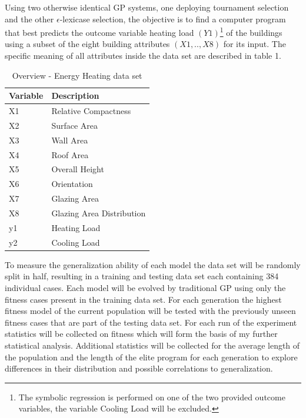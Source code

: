 \documentclass[
  12pt,
]{article}
\begin{document}
Using two otherwise identical GP systems, one deploying tournament
selection and the other \(\epsilon\)-lexicase selection, the objective
is to find a computer program that best predicts the outcome variable
heating load \((Y1)\)\footnote{The symbolic regression is performed on
  one of the two provided outcome variables, the variable Cooling Load
  will be excluded.} of the buildings using a subset of the eight
building attributes \((X1,..,X8)\) for its input. The specific meaning
of all attributes inside the data set are described in table 1.

\begin{table}[!h]

\caption{\label{tab:unnamed-chunk-1}Overview - Energy Heating data set}
\centering
\begin{tabular}[t]{l|l}
\hline
\textbf{Variable} & \textbf{Description}\\
\hline
X1 & Relative Compactness\\
\hline
X2 & Surface Area\\
\hline
X3 & Wall Area\\
\hline
X4 & Roof Area\\
\hline
X5 & Overall Height\\
\hline
X6 & Orientation\\
\hline
X7 & Glazing Area\\
\hline
X8 & Glazing Area Distribution\\
\hline
y1 & Heating Load\\
\hline
y2 & Cooling Load\\
\hline
\end{tabular}
\end{table}

To measure the generalization ability of each model the data set will be
randomly split in half, resulting in a training and testing data set
each containing 384 individual cases. Each model will be evolved by
traditional GP using only the fitness cases present in the training data
set. For each generation the highest fitness model of the current
population will be tested with the previously unseen fitness cases that
are part of the testing data set. For each run of the experiment
statistics will be collected on fitness which will form the basis of my
further statistical analysis. Additional statistics will be collected
for the average length of the population and the length of the elite
program for each generation to explore differences in their distribution
and possible correlations to generalization.
\end{document}
